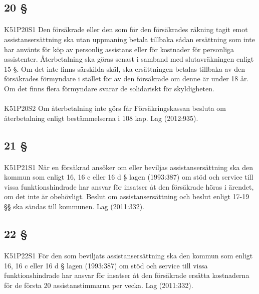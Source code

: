 \documentclass[a4paper,notitlepage,openany,10pt]{book}
\begin{document}
\subsection*{20 §}
\paragraph*{}
{\tiny K51P20S1}
Den försäkrade eller den som för den försäkrades räkning tagit emot assistansersättning ska utan uppmaning betala tillbaka sådan ersättning som inte har använts för köp av personlig assistans eller för kostnader för personliga assistenter. Återbetalning ska göras senast i samband med slutavräkningen enligt 15 §. Om det inte finns särskilda skäl, ska ersättningen betalas tillbaka av den försäkrades förmyndare i stället för av den försäkrade om denne är under 18 år. Om det finns flera förmyndare svarar de solidariskt för skyldigheten.
\paragraph*{}
{\tiny K51P20S2}
Om återbetalning inte görs får Försäkringskassan besluta om återbetalning enligt bestämmelserna i 108 kap.
Lag (2012:935).
\subsection*{21 §}
\paragraph*{}
{\tiny K51P21S1}
När en försäkrad ansöker om eller beviljas assistansersättning ska den kommun som enligt 16, 16 c eller 16 d § lagen (1993:387) om stöd och service till vissa funktionshindrade har ansvar för insatser åt den försäkrade höras i ärendet, om det inte är obehövligt.
Beslut om assistansersättning och beslut enligt 17-19 §§ ska sändas till kommunen.
Lag (2011:332).
\subsection*{22 §}
\paragraph*{}
{\tiny K51P22S1}
För den som beviljats assistansersättning ska den kommun som enligt 16, 16 c eller 16 d § lagen (1993:387) om stöd och service till vissa funktionshindrade har ansvar för insatser åt den försäkrade ersätta kostnaderna för de första 20 assistanstimmarna per vecka.
Lag (2011:332).
\end{document}
